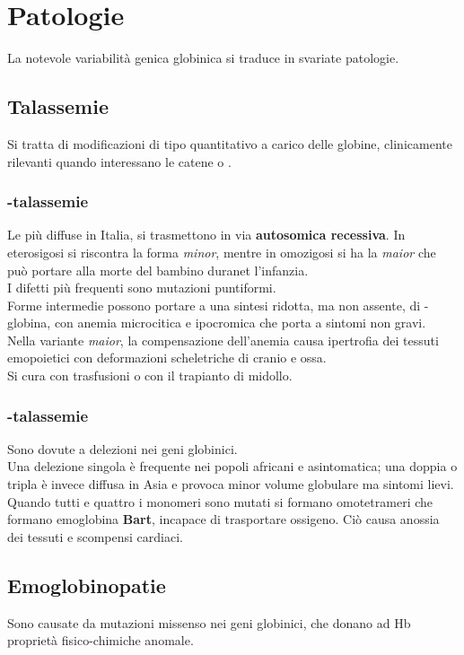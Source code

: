 \documentclass[a4paper, 12pt]{article}
\begin{document}
\section{Patologie}
La notevole variabilità genica globinica si traduce in svariate patologie.

\subsection{Talassemie}
Si tratta di modificazioni di tipo quantitativo a carico delle globine, clinicamente rilevanti quando interessano le catene {\textalpha} o {\textbeta}.

\subsubsection{\textbeta-talassemie}
Le più diffuse in Italia, si trasmettono in via \textbf{autosomica recessiva}. In eterosigosi si riscontra la forma \textit{minor}, mentre in omozigosi si ha la \textit{maior} che può portare alla morte del bambino duranet l'infanzia.\\
I difetti più frequenti sono mutazioni puntiformi.\\
Forme intermedie possono portare a una sintesi ridotta, ma non assente, di \textbeta-globina, con anemia microcitica e ipocromica che porta a sintomi non gravi.\\
Nella variante \textit{maior}, la compensazione dell'anemia causa ipertrofia dei tessuti emopoietici con deformazioni scheletriche di cranio e ossa.\\
Si cura con trasfusioni o con il trapianto di midollo.

\subsubsection{\textalpha-talassemie}
Sono dovute a delezioni nei geni globinici.\\ Una delezione singola è frequente nei popoli africani e asintomatica; una doppia o tripla è invece diffusa in Asia e provoca minor volume globulare ma sintomi lievi.\\
Quando tutti e quattro i monomeri sono mutati si formano omotetrameri {\textgamma} che formano emoglobina \textbf{Bart}, incapace di trasportare ossigeno. Ciò causa anossia dei tessuti e scompensi cardiaci.

\subsection{Emoglobinopatie}
Sono causate da mutazioni missenso nei geni globinici, che donano ad Hb proprietà fisico-chimiche anomale.
\end{document}

